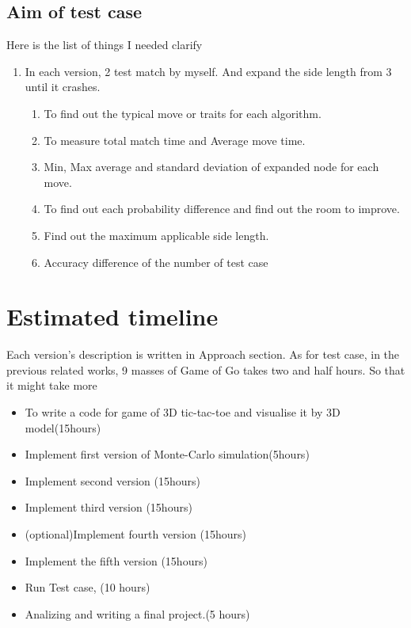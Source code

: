 \documentclass[11pt]{article}
\begin{document}
\subsection{Aim of test case}
Here is the list of things I needed clarify
\begin{enumerate}
\item In each version, 2 test match by myself. And expand the side length from 3 until it crashes.
\begin{enumerate}
\item To find out the typical move or traits for each algorithm.
\item To measure total match time and Average move time.
\item Min, Max average and standard deviation of expanded node for each move.
\item To find out each probability difference and find out the room to improve.
\item Find out the maximum applicable side length. 
\item Accuracy difference of the number of test case
\end{enumerate}

\end{enumerate}
\section{Estimated timeline}
Each version's description is written in Approach section. As for test case, in the previous related works, 9 masses of Game of Go takes two and half hours. So that it might take more 
\begin{itemize} 
\item To write a code for game of 3D tic-tac-toe and visualise it by 3D model(15hours)
\item Implement first version of Monte-Carlo simulation(5hours)
\item Implement second version (15hours)
\item Implement third version (15hours)
\item (optional)Implement fourth version (15hours)
\item Implement the fifth version (15hours)
\item Run Test case, (10 hours)
\item Analizing and writing a final project.(5 hours) 
\end{itemize}






%
{}

\end{document}

